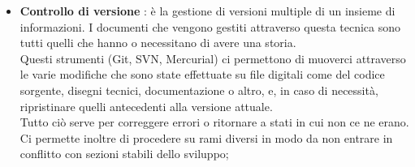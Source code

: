 \begin{itemize}
	\item \textbf{Controllo di versione} :  è la gestione di versioni multiple di un insieme di informazioni. I documenti che vengono gestiti attraverso questa tecnica sono tutti quelli che hanno o necessitano di avere una storia.\\
Questi strumenti (Git, SVN, Mercurial) ci permettono di muoverci attraverso le varie modifiche che sono state effettuate su file digitali come del codice sorgente, disegni tecnici, documentazione o altro, e, in caso di necessità, ripristinare quelli antecedenti alla versione attuale. \\
Tutto ciò serve per correggere errori o ritornare a stati in cui non ce ne erano. Ci permette inoltre di procedere su rami diversi in modo da non entrare in conflitto con sezioni stabili dello sviluppo;

\end{itemize}